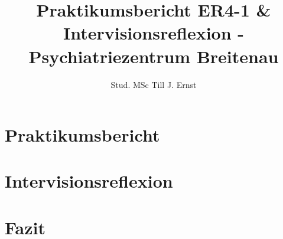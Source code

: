 \documentclass[jou,a4paper,apacite]{apa6}
\title{Praktikumsbericht ER4-1 \& Intervisionsreflexion - Psychiatriezentrum Breitenau}
\author{Stud. MSc Till J. Ernst}
\affiliation{Applied Psychology ZHAW}
\begin{document}
\maketitle    

\section{Praktikumsbericht}\label{sec:Praktikumsbericht}




\section{Intervisionsreflexion}\label{sec:Intervision}


\section{Fazit}\label{sec:Fazit}


\begin{flushleft}
\nocite{*}
{}
\end{flushleft}
\end{document}
